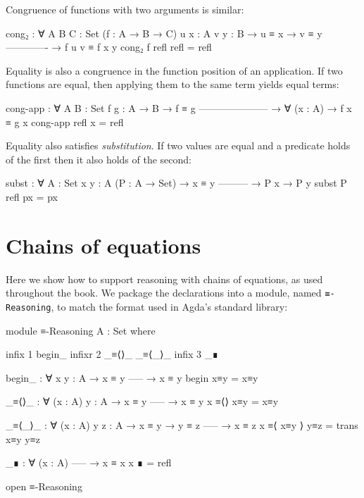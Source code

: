 Congruence of functions with two arguments is similar:

\begin{fence}
\begin{code}
cong₂ : ∀ {A B C : Set} (f : A → B → C) {u x : A} {v y : B}
  → u ≡ x
  → v ≡ y
    -------------
  → f u v ≡ f x y
cong₂ f refl refl  =  refl
\end{code}
\end{fence}

Equality is also a congruence in the function position of an
application. If two functions are equal, then applying them to the same
term yields equal terms:

\begin{fence}
\begin{code}
cong-app : ∀ {A B : Set} {f g : A → B}
  → f ≡ g
    ---------------------
  → ∀ (x : A) → f x ≡ g x
cong-app refl x = refl
\end{code}
\end{fence}

Equality also satisfies \emph{substitution}. If two values are equal and
a predicate holds of the first then it also holds of the second:

\begin{fence}
\begin{code}
subst : ∀ {A : Set} {x y : A} (P : A → Set)
  → x ≡ y
    ---------
  → P x → P y
subst P refl px = px
\end{code}
\end{fence}

\hypertarget{chains-of-equations}{%
\section{Chains of equations}\label{chains-of-equations}}

Here we show how to support reasoning with chains of equations, as used
throughout the book. We package the declarations into a module, named
\texttt{≡-Reasoning}, to match the format used in Agda's standard
library:

\begin{fence}
\begin{code}
module ≡-Reasoning {A : Set} where

  infix  1 begin_
  infixr 2 _≡⟨⟩_ _≡⟨_⟩_
  infix  3 _∎

  begin_ : ∀ {x y : A}
    → x ≡ y
      -----
    → x ≡ y
  begin x≡y  =  x≡y

  _≡⟨⟩_ : ∀ (x : A) {y : A}
    → x ≡ y
      -----
    → x ≡ y
  x ≡⟨⟩ x≡y  =  x≡y

  _≡⟨_⟩_ : ∀ (x : A) {y z : A}
    → x ≡ y
    → y ≡ z
      -----
    → x ≡ z
  x ≡⟨ x≡y ⟩ y≡z  =  trans x≡y y≡z

  _∎ : ∀ (x : A)
      -----
    → x ≡ x
  x ∎  =  refl

open ≡-Reasoning
\end{code}
\end{fence}

